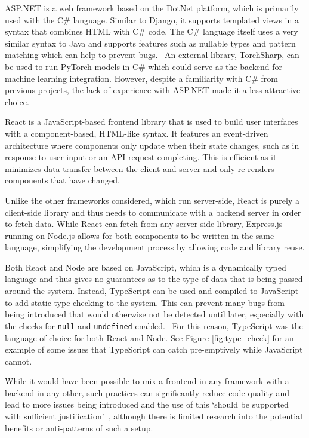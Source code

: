 ASP.NET is a web framework based on the DotNet platform, which is primarily used with the C\# language.
Similar to Django, it supports templated views in a syntax that combines HTML with C\# code. The C\# language
itself uses a very similar syntax to Java and supports features such as nullable types and pattern matching
which can help to prevent bugs.~\cite{gao_type_2017} An external library, TorchSharp, can be used to run
PyTorch models in C\# which could serve as the backend for machine learning integration. However, despite
a familiarity with C\# from previous projects, the lack of experience with ASP.NET made it a less attractive
choice.

React is a JavaScript-based frontend library that is used to build user interfaces with a component-based,
HTML-like syntax. It features an event-driven architecture where components only update when their state changes,
such as in response to user input or an API request completing. This is efficient as it minimizes data transfer
between the client and server and only re-renders components that have changed.

Unlike the other frameworks considered, which run server-side, React is purely a client-side library and thus
needs to communicate with a backend server in order to fetch data. While React can fetch from any server-side
library, Express.js running on Node.js allows for both components to be written in the same language, simplifying
the development process by allowing code and library reuse.

Both React and Node are based on JavaScript, which is a dynamically typed language and thus gives no guarantees
as to the type of data that is being passed around the system. Instead, TypeScript can be used and compiled to
JavaScript to add static type checking to the system. This can prevent many bugs from being introduced that would
otherwise not be detected until later, especially with the checks for \texttt{null} and \texttt{undefined} enabled.~\cite{gao_type_2017}
For this reason, TypeScript was the language of choice for both React and Node. See Figure \ref{fig:type_check} for an
example of some issues that TypeScript can catch pre-emptively while JavaScript cannot.

While it would have been possible to mix a frontend in any framework with a backend in any other, such practices
can significantly reduce code quality and lead to more issues being introduced and the use of this \enquote*{should
be supported with sufficient justification}~\cite{kochhar_large_2016}, although there is limited research into
the potential benefits or anti-patterns of such a setup.~\cite{kochhar_large_2016}

